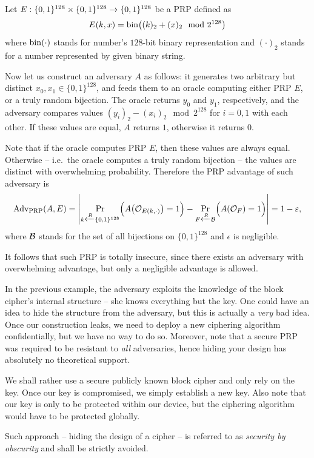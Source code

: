 \begin{example}
	Let $E:\{0,1\}^{128}\times\{0,1\}^{128}\rightarrow\{0,1\}^{128}$ be a PRP defined as
	\[
		E(k,x) = \operatorname*{bin}\bigl((k)_2 + (x)_2\mod{2^{128}}\bigr)
	\]
	where $\operatorname*{bin}(\cdot)$ stands for number's $128$-bit binary representation and $(\cdot)_2$ stands for a number represented by given binary string.
	
	Now let us construct an adversary $A$ as follows: it generates two arbitrary but distinct $x_0,x_1\in\{0,1\}^{128}$, and feeds them to an oracle computing either PRP $E$, or a truly random bijection. The oracle returns $y_0$ and $y_1$, respectively, and the adversary compares values $(y_i)_2 - (x_i)_2 \mod{2^{128}}$ for $i=0,1$ with each other. If these values are equal, $A$ returns $1$, otherwise it returns $0$.
	
	Note that if the oracle computes PRP $E$, then these values are always equal. Otherwise -- i.e.\ the oracle computes a truly random bijection -- the values are distinct with overwhelming probability. Therefore the PRP advantage of such adversary is
	\[
		\operatorname*{Adv_{PRP}}(A,E) = \left| \Pr\limits_{k\xleftarrow{R} \{0,1\}^{128}}\Bigl(A\bigl({\cal O}_{E(k,\cdot)}\bigr)=1\Bigr) - \Pr\limits_{F\xleftarrow{R} {\cal B}}\Bigl(A({\cal O}_F)=1\Bigr) \right| = 1 - \varepsilon ,
	\]
	where $\cal B$ stands for the set of all bijections on $\{0,1\}^{128}$ and $\epsilon$ is negligible.
	
	It follows that such PRP is totally insecure, since there exists an adversary with overwhelming advantage, but only a negligible advantage is allowed.
\end{example}

\begin{note}   %
\label{note:secbyobsc}
	In the previous example, the adversary exploits the knowledge of the block cipher's internal structure -- she knows everything but the key. One could have an idea to hide the structure from the adversary, but this is actually a {\em very} bad idea. Once our construction leaks, we need to deploy a new ciphering algorithm confidentially, but we have no way to do so. Moreover, note that a secure PRP was required to be resistant to {\em all} adversaries, hence hiding your design has absolutely no theoretical support.
	
	We shall rather use a secure publicly known block cipher and only rely on the key. Once our key is compromised, we simply establish a new key. Also note that our key is only to be protected within our device, but the ciphering algorithm would have to be protected globally.
	
	Such approach -- hiding the design of a cipher -- is referred to as {\em security by obscurity} and shall be strictly avoided.
\end{note}

